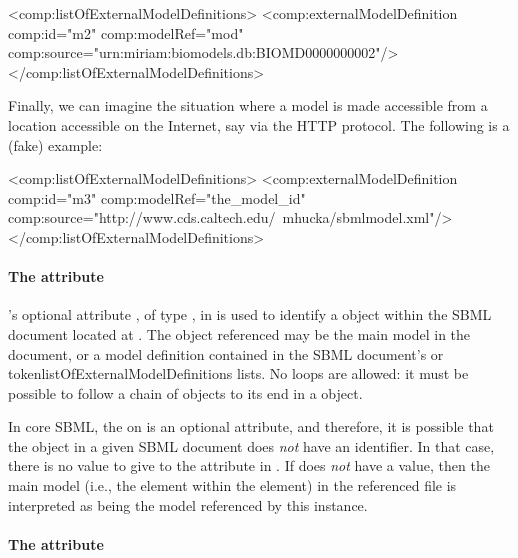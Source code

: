\begin{example}
<comp:listOfExternalModelDefinitions>
    <comp:externalModelDefinition comp:id="m2" comp:modelRef="mod"
                                  comp:source="urn:miriam:biomodels.db:BIOMD0000000002"/>
</comp:listOfExternalModelDefinitions>
\end{example}

Finally, we can imagine the situation where a model is made accessible
from a location accessible on the Internet, say via the HTTP protocol.
The following is a (fake) example:

\begin{example}
<comp:listOfExternalModelDefinitions>
    <comp:externalModelDefinition comp:id="m3" comp:modelRef="the_model_id"
                                  comp:source="http://www.cds.caltech.edu/~mhucka/sbmlmodel.xml"/>
</comp:listOfExternalModelDefinitions>
\end{example}



\paragraph{The \fixttspace{} attribute}

\ExternalModelDefinition's optional attribute , of type
, in is used to identify a \Model object within the
SBML document located at .  The object referenced may be
the main model in the document, or a model definition contained in the
SBML document's  or
token{listOfExternalModelDefinitions} lists.  No loops are allowed: it
must be possible to follow a chain of \ExternalModelDefinition objects
to its end in a \Model object.

In core SBML, the  on \Model is an optional attribute, and
therefore, it is possible that the \Model object in a given SBML
document does \emph{not} have an identifier.  In that case, there is no
value to give to the  attribute in
\ExternalModelDefinition.  If  does \emph{not} have a
value, then the main model (i.e., the  element within the
 element) in the referenced file is interpreted as being
the model referenced by this \ExternalModelDefinition instance.


\paragraph{The \fixttspace{} attribute}

